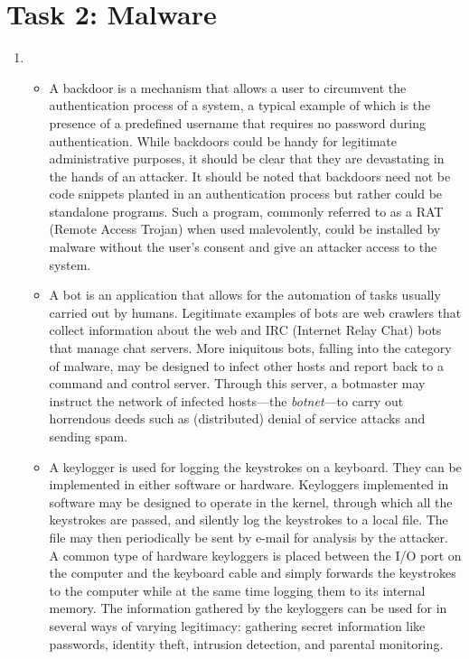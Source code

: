 \section*{Task 2: Malware}
\begin{enumerate}
\item %
  \begin{itemize}
  \item A backdoor is a mechanism that allows a user to circumvent the authentication process of a system, a typical example of which is the presence of a predefined username that requires no password during authentication. While backdoors could be handy for legitimate administrative purposes, it should be clear that they are devastating in the hands of an attacker. It should be noted that backdoors need not be code snippets planted in an authentication process but rather could be standalone programs. Such a program, commonly referred to as a RAT (Remote Access Trojan) when used malevolently, could be installed by malware without the user's consent and give an attacker access to the system.\cite{aycock06}
  \item
    A bot is an application that allows for the automation of tasks usually carried out by humans. Legitimate examples of bots are web crawlers that collect information about the web and IRC (Internet Relay Chat) bots that manage chat servers\cite{cisco_difference}. More iniquitous bots, falling into the category of malware, may be designed to infect other hosts and report back to a command and control server. Through this server, a botmaster may instruct the network of infected hosts---the \textit{botnet}---to carry out horrendous deeds such as (distributed) denial of service attacks and sending spam\cite{cisco_botnets}.
  \item
    A keylogger is used for logging the keystrokes on a keyboard. They can be implemented in either software or hardware. Keyloggers implemented in software may be designed to operate in the kernel, through which all the keystrokes are passed, and silently log the keystrokes to a local file. The file may then periodically be sent by e-mail for analysis by the attacker\cite{wikipedia_keylogger}. A common type of hardware keyloggers is placed between the I/O port on the computer and the keyboard cable and simply forwards the keystrokes to the computer while at the same time logging them to its internal memory. The information gathered by the keyloggers can be used for in several ways of varying legitimacy: gathering secret information like passwords, identity theft, intrusion detection, and parental monitoring\cite{sagirogly09}.


\end{itemize}
\end{enumerate}
